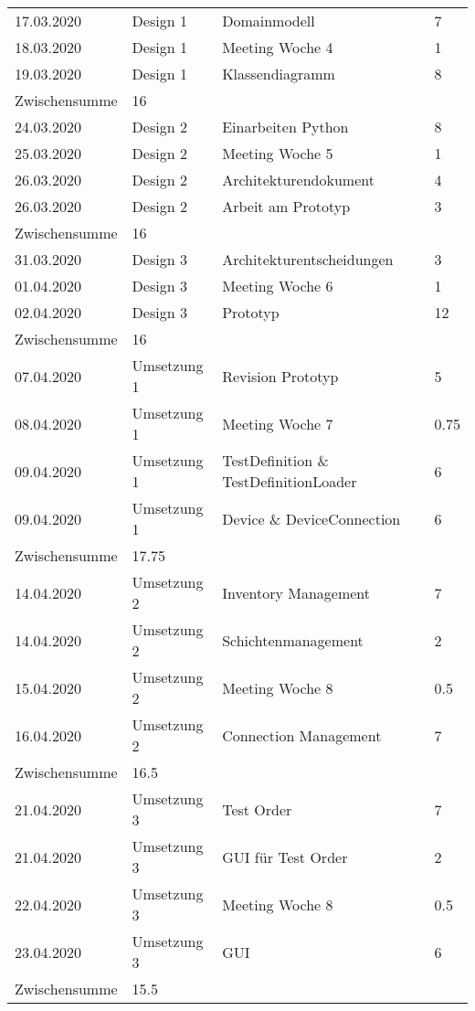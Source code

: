 \documentclass[
	ngerman,
	toc=listof, %
	toc=bibliography, %
	footnotes=multiple, %
	parskip=half, %
	numbers=noendperiod %
]{scrartcl}
\begin{document}
	\begin{tabularx}{\textwidth}{llXl}
		\toprule
		17.03.2020 & Design 1 & Domainmodell & 7 \\
		18.03.2020 & Design 1 & Meeting Woche 4 & 1 \\
		19.03.2020 & Design 1 & Klassendiagramm & 8 \\
		\midrule
		Zwischensumme & 16 & & \\
		\midrule
		24.03.2020 & Design 2 & Einarbeiten Python & 8 \\
		25.03.2020 & Design 2 & Meeting Woche 5 & 1 \\
		26.03.2020 & Design 2 & Architekturendokument & 4 \\
		26.03.2020 & Design 2 & Arbeit am Prototyp & 3 \\
		\midrule
		Zwischensumme & 16 & & \\
		\midrule
		31.03.2020 & Design 3 & Architekturentscheidungen & 3 \\
		01.04.2020 & Design 3 & Meeting Woche 6 & 1 \\
		02.04.2020 & Design 3 & Prototyp & 12 \\
		\midrule
		Zwischensumme & 16 & & \\
		\midrule
		07.04.2020 & Umsetzung 1 & Revision Prototyp & 5 \\
		08.04.2020 & Umsetzung 1 & Meeting Woche 7 & 0.75 \\
		09.04.2020 & Umsetzung 1 & TestDefinition \& TestDefinitionLoader & 6 \\
		09.04.2020 & Umsetzung 1 & Device \& DeviceConnection & 6 \\
		\midrule
		Zwischensumme & 17.75 & & \\
		\midrule
		14.04.2020 & Umsetzung 2 & Inventory Management & 7 \\
		14.04.2020 & Umsetzung 2 & Schichtenmanagement & 2 \\
		15.04.2020 & Umsetzung 2 & Meeting Woche 8 & 0.5 \\
		16.04.2020 & Umsetzung 2 & Connection Management & 7 \\
		\midrule
		Zwischensumme & 16.5 & & \\
		\midrule
		21.04.2020 & Umsetzung 3 & Test Order & 7 \\
		21.04.2020 & Umsetzung 3 & GUI für Test Order & 2 \\
		22.04.2020 & Umsetzung 3 & Meeting Woche 8 & 0.5 \\
		23.04.2020 & Umsetzung 3 & GUI & 6 \\
		\midrule
		Zwischensumme & 15.5 & & \\
		\bottomrule
	\end{tabularx}
\end{document}
